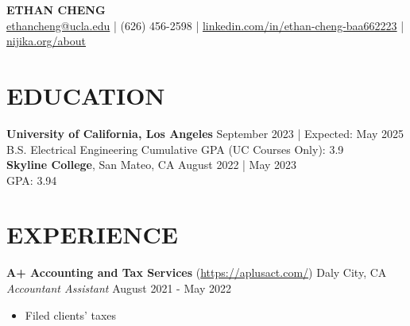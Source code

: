 \documentclass[letterpaper,9pt]{extarticle}
\begin{document}

\begin{center}
\textbf{\Large ETHAN CHENG}\\[2pt]
	\href{mailto:ethancheng@ucla.edu}{ethancheng@ucla.edu} | (626) 456-2598 | \href{https://www.linkedin.com/in/ethan-cheng-baa662223}{linkedin.com/in/ethan-cheng-baa662223} | \href{http://www.nijika.org/about/}{nijika.org/about}
\end{center}

\section*{EDUCATION}
\noindent
\textbf{University of California, Los Angeles} \hfill September 2023 | Expected: May 2025\\
B.S. Electrical Engineering \hfill Cumulative GPA (UC Courses Only): 3.9\\ %

\noindent
\textbf{Skyline College}, San Mateo, CA \hfill August 2022 | May 2023\\
\null \hfill GPA: 3.94

\section*{EXPERIENCE}
\noindent
\textbf{A+ Accounting and Tax Services} (\url{https://aplusact.com/}) \hfill Daly City, CA\\
\textit{Accountant Assistant} \hfill August 2021 - May 2022 %
\begin{itemize}
	\item Filed clients' taxes
\end{itemize}

%
\end{document}
